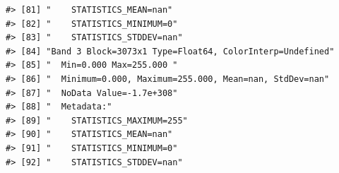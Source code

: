\documentclass[
]{book}
\begin{document}
\begin{verbatim}
#> [81] "    STATISTICS_MEAN=nan"                                                                                                                                                                                                                                                        
#> [82] "    STATISTICS_MINIMUM=0"                                                                                                                                                                                                                                                       
#> [83] "    STATISTICS_STDDEV=nan"                                                                                                                                                                                                                                                      
#> [84] "Band 3 Block=3073x1 Type=Float64, ColorInterp=Undefined"                                                                                                                                                                                                                        
#> [85] "  Min=0.000 Max=255.000 "                                                                                                                                                                                                                                                       
#> [86] "  Minimum=0.000, Maximum=255.000, Mean=nan, StdDev=nan"                                                                                                                                                                                                                         
#> [87] "  NoData Value=-1.7e+308"                                                                                                                                                                                                                                                       
#> [88] "  Metadata:"                                                                                                                                                                                                                                                                    
#> [89] "    STATISTICS_MAXIMUM=255"                                                                                                                                                                                                                                                     
#> [90] "    STATISTICS_MEAN=nan"                                                                                                                                                                                                                                                        
#> [91] "    STATISTICS_MINIMUM=0"                                                                                                                                                                                                                                                       
#> [92] "    STATISTICS_STDDEV=nan"
\end{verbatim}
\end{document}
